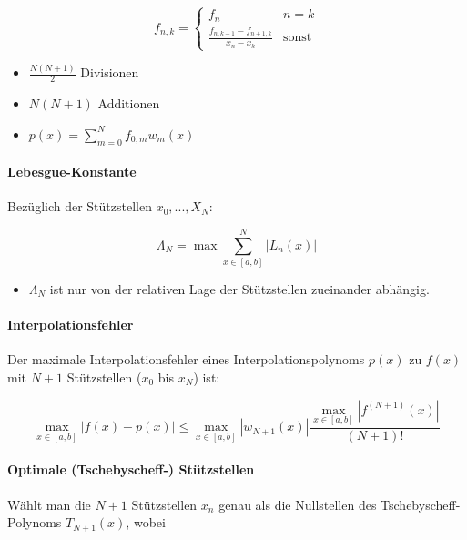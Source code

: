 \documentclass[a4paper, 14pt]{article}
\begin{document}
	\begin{equation}
		f_{n, k} = \begin{cases}
			f_{n} & n = k \\
			\frac{f_{n, k - 1} - f_{n + 1, k}}{x_n - x_k} & \textrm{sonst}
		\end{cases}
	\end{equation}

	\begin{itemize}
		\item $\frac{N(N + 1)}{2}$ Divisionen
		\item $N(N + 1)$ Additionen
		\item $p(x) = \sum_{m = 0}^{N}{f_{0, m} w_m(x)}$
	\end{itemize}

	\paragraph{Lebesgue-Konstante}

	Bezüglich der Stützstellen $x_0, ..., X_N$:

	\begin{equation}
		\Lambda_N = \max{\sum_{x \in [a, b]}^{N}{|L_n(x)|}}
	\end{equation}

	\begin{itemize}
		\item $\Lambda_N$ ist nur von der relativen Lage der Stützstellen zueinander abhängig.
	\end{itemize}

	\paragraph{Interpolationsfehler}

	Der maximale Interpolationsfehler eines Interpolationspolynoms $p(x)$ zu $f(x)$ mit $N + 1$ Stützstellen ($x_0$ bis $x_N$) ist:

	\begin{equation}
		\max_{x \in [a, b]}{|f(x) - p(x)|} \leq \max_{x \in [a, b]}{|w_{N + 1}(x)|}\frac{\max_{x \in [a, b]}{|f^{(N + 1)}(x)|}}{(N + 1)!}
	\end{equation}

	\paragraph{Optimale (Tschebyscheff-) Stützstellen}
	
	Wählt man die $N + 1$ Stützstellen $x_n$ genau als die Nullstellen des Tschebyscheff-Polynoms $T_{N + 1}(x)$, wobei
\end{document}
